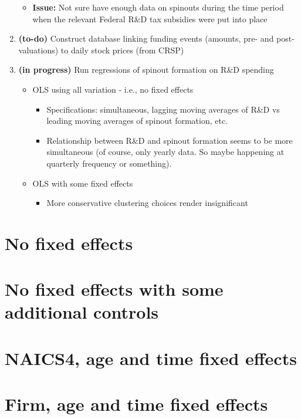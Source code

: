 \documentclass[12pt,english]{article}
\theoremstyle{remark}
\begin{document}
\begin{enumerate}
\begin{itemize}
		\item \textbf{Issue: } Not sure have enough data on spinouts during the time period when the relevant Federal R\&D tax subsidies were put into place
	\end{itemize}
	\item \textbf{(to-do)} Construct database linking funding events (amounts, pre- and post- valuations) to daily stock prices (from CRSP)
	\item \textbf{(in progress)} Run regressions of spinout formation on R\&D spending
	\begin{itemize}
		\item OLS using all variation - i.e., no fixed effects
		\begin{itemize}
			\item Specifications: simultaneous, lagging moving averages of R\&D vs leading moving averages of spinout formation, etc.
			\item Relationship between R\&D and spinout formation seems to be more simultaneous (of course, only yearly data. So maybe happening at quarterly frequency or something).
		\end{itemize}
		\item OLS with some fixed effects
		\begin{itemize}
			\item More conservative clustering choices render insignificant
		\end{itemize}
	\end{itemize}
\end{enumerate}


\section*{No fixed effects}




\section*{No fixed effects with some additional controls}



\section*{NAICS4, age and time fixed effects}



\section*{Firm, age and time fixed effects}


\end{document}
